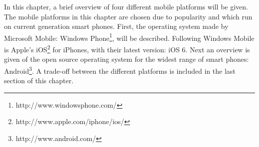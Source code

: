 In this chapter, a brief overview of four different mobile platforms will be given. The mobile platforms in this chapter are chosen due to popularity and which run on current generation smart phones. First, the operating system made by Microsoft Mobile: Windows Phone\footnote{http://www.windowsphone.com/}, will be described. Following Windows Mobile is Apple's iOS\footnote{http://www.apple.com/iphone/ios/} for iPhones, with their latest version: iOS 6. Next an overview is given of the open source operating system for the widest range of smart phones: Android\footnote{http://www.android.com/}. A trade-off between the different platforms is included in the last section of this chapter.